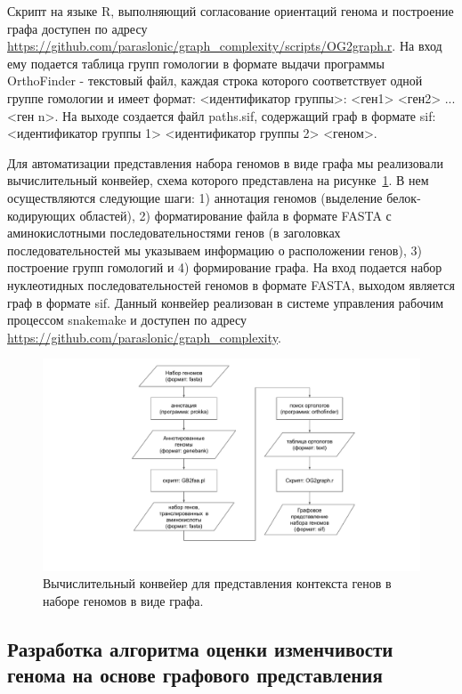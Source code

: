 Скрипт на языке R, выполняющий согласование ориентаций генома и построение графа доступен по адресу \url{https://github.com/paraslonic/graph_complexity/scripts/OG2graph.r}. На вход ему подается таблица групп гомологии в формате выдачи программы OrthoFinder - текстовый файл, каждая строка которого соответствует одной группе гомологии и имеет формат: <идентификатор группы>: <ген1> <ген2> ... <ген n>. На выходе создается файл paths.sif, содержащий граф в формате sif: <идентификатор группы 1> <идентификатор группы 2> <геном>. 

Для автоматизации представления набора геномов в виде графа мы реализовали вычислительный конвейер, схема которого представлена на рисунке~\ref{img:graph_pipe_schema}. В нем осуществляются следующие шаги: 1) аннотация геномов (выделение белок-кодирующих областей), 2) форматирование файла в формате FASTA с аминокислотными последовательностями генов (в заголовках последовательностей мы указываем информацию о расположении генов), 3) построение групп гомологий и 4) формирование графа. На вход подается набор нуклеотидных последовательностей геномов в формате FASTA, выходом является граф в формате sif. Данный конвейер реализован в системе управления рабочим процессом snakemake и доступен по адресу \url{https://github.com/paraslonic/graph_complexity}.

\begin{figure}[!ht] 
  \center
    \includegraphics [width=\textwidth] {Dissertation/images/graph/graph_complexity_schema.pdf}
    \caption{Вычислительный конвейер для представления контекста генов в наборе геномов в виде графа.}
    \label{img:graph_pipe_schema}
\end{figure}

\subsection{Разработка алгоритма оценки изменчивости генома на основе графового представления}

